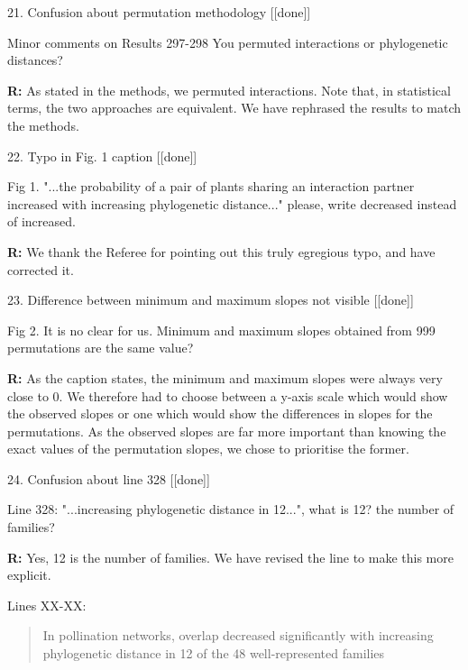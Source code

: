 \documentclass[12pt]{letter}
\newenvironment{refquote}{\bigskip \begin{it}}{\end{it}\smallskip}
\begin{document}
	21. Confusion about permutation methodology [[done]]

		\begin{refquote}
			Minor comments on Results
			297-298 You permuted interactions or phylogenetic distances?
		\end{refquote}


		\textbf{R:} As stated in the methods, we permuted interactions. Note that, in statistical terms, the two approaches are equivalent. We have rephrased the results to match the methods.


	22. Typo in Fig. 1 caption [[done]]

		\begin{refquote}
			Fig 1. "...the probability of a pair of plants sharing an interaction partner increased with increasing phylogenetic distance..." please, write decreased instead of increased.
		\end{refquote}


		\textbf{R:} We thank the Referee for pointing out this truly egregious typo, and have corrected it.


	23. Difference between minimum and maximum slopes not visible [[done]]

		\begin{refquote}
			Fig 2. It is no clear for us. Minimum and maximum slopes obtained from 999 permutations are the same value?
		\end{refquote}


		\textbf{R:} As the caption states, the minimum and maximum slopes were always very close to 0. We therefore had to choose between a y-axis scale which would show the observed slopes or one which would show the differences in slopes for the permutations. As the  observed slopes are far more important than knowing the exact values of the permutation slopes, we chose to prioritise the former.


	24. Confusion about line 328 [[done]]

		\begin{refquote}
			Line  328: "...increasing phylogenetic distance in 12...", what is 12? the number of families?
		\end{refquote}

		\textbf{R:} Yes, 12 is the number of families. We have revised the line to make this more explicit.


		Lines XX-XX: 


		\begin{quotation}

		In pollination networks, overlap decreased significantly with increasing phylogenetic distance in 12 of the 48 well-represented families

		\end{quotation}
\end{document}
